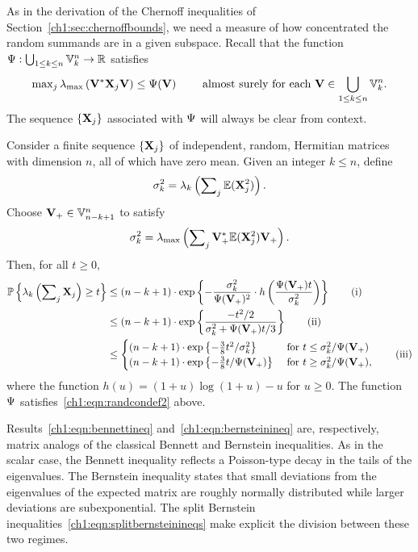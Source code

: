 As in the derivation of the Chernoff inequalities of Section~\ref{ch1:sec:chernoffbounds}, 
we need a measure of how concentrated the random
summands are in a given subspace. Recall that the function $\Psi :
\bigcup_{1 \leq k \leq n} \mathbb{V}_{k}^{n} \rightarrow \mathbb{R}$ satisfies
\begin{equation}
	\max\nolimits_j \lambda_{\mathrm{max}}\left(\mathbf{V}^* \mathbf{X}_j \mathbf{V}\right) \leq
\Psi(\mathbf{V}) \qquad \text{ almost surely for each } \mathbf{V} \in \bigcup_{1
\leq k \leq n} \mathbb{V}_{k}^{n}. 
\label{ch1:eqn:randcondef2}
\end{equation}
The sequence $\{\mathbf{X}_j\}$ associated with $\Psi$ will always be clear
from context.

\begin{thm}
\label{ch1:thm:bennett}
Consider a finite sequence $\{\mathbf{X}_j\}$ of independent, random, Hermitian
matrices with dimension $n$, all of which have zero mean. Given an integer $k
\leq n$, define
\[
 \sigma_k^2 = \lambda_k\left(\sum\nolimits_j \mathbb{E}(\mathbf{X}_j^2) \right). 
\]
Choose $\mathbf{V}_{+}\in \mathbb{V}_{n-k+1}^{n}$ to satisfy
\[
 \sigma_k^2 = \lambda_{\mathrm{max}}\left(\sum\nolimits_j
\mathbf{V}_{+}^*\mathbb{E}(\mathbf{X}_j^2)\mathbf{V}_{+}\right).
\]
Then, for all $t \geq 0,$
\begin{align}
\mathbb{P}\left\{\lambda_k\left( \sum\nolimits_j \mathbf{X}_j \right) \geq t \right\} & \leq (n-k+1)
\cdot \mathrm{exp}\left\{-\frac{\sigma_k^2}{\Psi(\mathbf{V}_{+})^2} \cdot
h\left(\frac{\Psi(\mathbf{V}_{+})t}{\sigma_k^2}\right) \right\} \tag{i}
\label{ch1:eqn:bennettineq} \\
 & \leq (n-k+1) \cdot \mathrm{exp}\left\{ \frac{-t^2/2}{\sigma_k^2 +
\Psi(\mathbf{V}_+)t/3} \right\} \tag{ii} \label{ch1:eqn:bernsteinineq} \\
 & \leq \begin{cases}
        (n-k+1) \cdot \mathrm{exp}\left\{-\tfrac{3}{8}t^2/\sigma_k^2\right\}  & \text{
for } t \leq \sigma_k^2/\Psi(\mathbf{V}_+) \\
        (n-k+1) \cdot \mathrm{exp}\left\{-\tfrac{3}{8} t/\Psi(\mathbf{V}_+)\right\} &
\text{ for } t \geq \sigma_k^2/\Psi(\mathbf{V}_+),  
        \end{cases} \tag{iii}  \label{ch1:eqn:splitbernsteinineqs} 
\end{align}
where the function $h(u) = (1+u)\log(1+u) - u$ for $u \geq 0.$ The function
$\Psi$ satisfies~\eqref{ch1:eqn:randcondef2} above.
\end{thm}

Results~\eqref{ch1:eqn:bennettineq} and~\eqref{ch1:eqn:bernsteinineq} are, respectively,
matrix analogs of the classical Bennett and Bernstein inequalities. As in the
scalar case, the Bennett inequality reflects a Poisson-type decay in the tails
of the eigenvalues. The Bernstein inequality states that small deviations from
the eigenvalues of the expected matrix are roughly normally distributed while
larger deviations are subexponential. The split Bernstein inequalities~\eqref{ch1:eqn:splitbernsteinineqs} 
make explicit the division between these two regimes.

